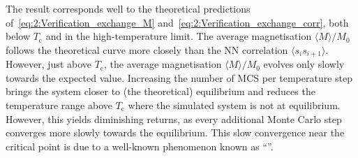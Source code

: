 
The \hotspice result corresponds well to the theoretical predictions of~\cref{eq:2:Verification_exchange_M} and~\cref{eq:2:Verification_exchange_corr}, both below $T_\mathrm{c}$ and in the high-temperature limit.
The average magnetisation $\langle M \rangle / M_0$ follows the theoretical curve more closely than the NN correlation $\langle s_i s_{i+1} \rangle$.
However, just above $T_\mathrm{c}$, the average magnetisation $\langle M \rangle / M_0$ evolves only slowly towards the expected value.
Increasing the number of MCS per temperature step brings the system closer to (the theoretical) equilibrium and reduces the temperature range above $T_\mathrm{c}$ where the simulated system is not at equilibrium.
However, this yields diminishing returns, as every additional Monte Carlo step converges more slowly towards the equilibrium.
This slow convergence near the critical point is due to a well-known phenomenon known as ``''.

